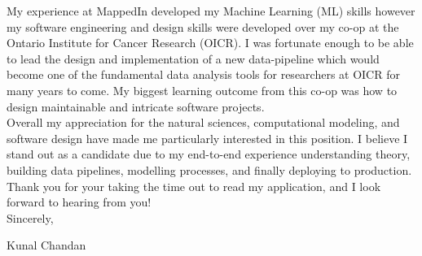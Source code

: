 \documentclass[]{chandan-cv}
\begin{document}
\begin{minipage}[t]{0.8\textwidth}
\qquad My experience at MappedIn developed my Machine Learning (ML) skills however my software engineering and design skills were developed over my co-op at the Ontario Institute for Cancer Research (OICR). 
I was fortunate enough to be able to lead the design and implementation of a new data-pipeline which would become one of the fundamental data analysis tools for researchers at OICR for many years to come. 
My biggest learning outcome from this co-op was how to design maintainable and intricate software projects.
\\


\qquad Overall my appreciation for the natural sciences, computational modeling, and software design have made me particularly interested in this position. 
I believe I stand out as a candidate due to my end-to-end experience understanding theory, building data pipelines, modelling processes, and finally deploying to production. 
\\


\qquad Thank you for your taking the time out to read my application, and I look forward to hearing from you!
\\


\qquad Sincerely,

\qquad Kunal Chandan
\\
\end{minipage}

%
%
\end{document}
